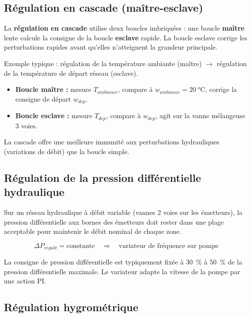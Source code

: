 \subsection{Régulation en cascade (maître-esclave)}

\begin{definition}
  La \textbf{régulation en cascade} utilise deux boucles imbriquées : une boucle \textbf{maître} lente calcule la consigne de la boucle \textbf{esclave} rapide. La boucle esclave corrige les perturbations rapides avant qu'elles n'atteignent la grandeur principale.
\end{definition}

Exemple typique : régulation de la température ambiante (maître) $\rightarrow$ régulation de la température de départ réseau (esclave).

\begin{itemize}
  \item \textbf{Boucle maître :} mesure $T_{ambiance}$, compare à $w_{ambiance} = \SI{20}{\celsius}$, corrige la consigne de départ $w_{dep}$.
  \item \textbf{Boucle esclave :} mesure $T_{dep}$, compare à $w_{dep}$, agit sur la vanne mélangeuse 3 voies.
\end{itemize}

La cascade offre une meilleure immunité aux perturbations hydrauliques (variations de débit) que la boucle simple.

\subsection{Régulation de la pression différentielle hydraulique}

Sur un réseau hydraulique à débit variable (vannes 2 voies sur les émetteurs), la pression différentielle aux bornes des émetteurs doit rester dans une plage acceptable pour maintenir le débit nominal de chaque zone.

\begin{equation}
  \Delta P_{regulé} = \text{constante} \quad \Rightarrow \quad \text{variateur de fréquence sur pompe}
\end{equation}

La consigne de pression différentielle est typiquement fixée à \SI{30}{\percent} à \SI{50}{\percent} de la pression différentielle maximale. Le variateur adapte la vitesse de la pompe par une action PI.

\subsection{Régulation hygrométrique}

